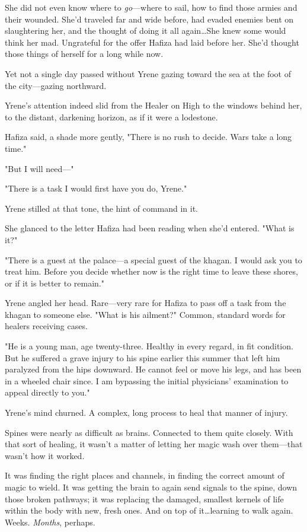 She did not even know where to \emph{go}---where to sail, how to find those armies and their wounded.
She'd traveled far and wide before, had evaded enemies bent on slaughtering her, and the thought of doing it all again\ldots She knew some would think her mad.
Ungrateful for the offer Hafiza had laid before her.
She'd thought those things of herself for a long while now.

Yet not a single day passed without Yrene gazing toward the sea at the foot of the city---gazing northward.

Yrene's attention indeed slid from the Healer on High to the windows behind her, to the distant, darkening horizon, as if it were a lodestone.

Hafiza said, a shade more gently, "There is no rush to decide.
Wars take a long time."

"But I will need---"

"There is a task I would first have you do, Yrene."

Yrene stilled at that tone, the hint of command in it.

She glanced to the letter Hafiza had been reading when she'd entered.
"What is it?"

"There is a guest at the palace---a special guest of the khagan.
I would ask you to treat him.
Before you decide whether now is the right time to leave these shores, or if it is better to remain."

Yrene angled her head.
Rare---very rare for Hafiza to pass off a task from the khagan to someone else.
"What is his ailment?"
Common, standard words for healers receiving cases.

"He is a young man, age twenty-three.
Healthy in every regard, in fit condition.
But he suffered a grave injury to his spine earlier this summer that left him paralyzed from the hips downward.
He cannot feel or move his legs, and has been in a wheeled chair since.
I am bypassing the initial physicians' examination to appeal directly to you."

Yrene's mind churned.
A complex, long process to heal that manner of injury.

Spines were nearly as difficult as brains.
Connected to them quite closely.
With that sort of healing, it wasn't a matter of letting her magic wash over them---that wasn't how it worked.

It was finding the right places and channels, in finding the correct amount of magic to wield.
It was getting the brain to again send signals to the spine, down those broken pathways; it was replacing the damaged, smallest kernels of life within the body with new, fresh ones.
And on top of it\ldots learning to walk again.
Weeks.
\emph{Months}, perhaps.

